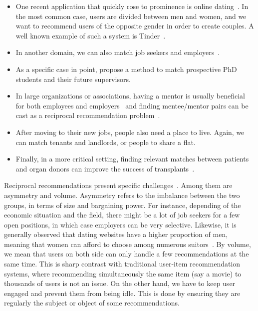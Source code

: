 \begin{itemize}[leftmargin=*]
  \item One recent application that quickly rose to prominence is online
    dating~\autocites{Krzywicki2015}{Xia2016a}{Alanazi}. In the most common case, users are divided
    between men and women, and we want to recommend users of the opposite gender in order to create
    couples. A well known example of such a system is Tinder~\autocite{TinderDesc16}.
  \item In another domain, we can also match job seekers and
    employers~\autocites{Siting2012}{Hong2013}{Kille2015}.
  \item As a specific case in point, \textcite{Zhang2016a} propose a method to match prospective PhD
    students and their future supervisors.
  \item In large organizations or associations, having a mentor is usually beneficial for
    both employees and employers~\autocite{mentorBenef04} and finding mentee/mentor pairs can be
    cast as a reciprocal recommendation problem~\autocite{OSSMentors12}.
  \item After moving to their new jobs, people also need a place to live. Again, we can match
    tenants and landlords, or people to share a flat.
  \item Finally, in a more critical setting, finding relevant matches between patients and organ
    donors can improve the success of transplants~\autocite{patientDonor17}.
\end{itemize}

Reciprocal recommendations present specific challenges~\autocite{Andrews2015}. Among them are
asymmetry and volume.  Asymmetry refers to the imbalance between the two groups, in terms of size
and bargaining power. For instance, depending of the economic situation and the field, there might
be a lot of job seekers for a few open positions, in which case employers can be very selective.
Likewise, it is generally observed that dating websites have a higher proportion of men, meaning
that women can afford to choose among numerous suitors~\autocite{TinderDesc16}. By volume, we mean
that users on both side can only handle a few recommendations at the same time. This is sharp
contrast with traditional user-item recommendation systems, where recommending simultaneously the
same item (say a movie) to thousands of users is not an issue. On the other hand, we have to keep
user engaged and prevent them from being idle. This is done by ensuring they are regularly the
subject or object of some recommendations.

